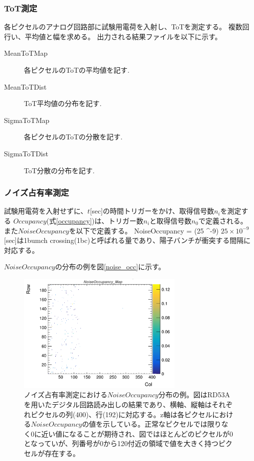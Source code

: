 \subsubsection{ToT測定}
各ピクセルのアナログ回路部に試験用電荷を入射し、ToTを測定する。
複数回行い、平均値と幅を求める。
出力される結果ファイルを以下に示す。
\begin{description}
  \item [MeanToTMap] 各ピクセルのToTの平均値を記す.
  \item [MeanToTDist] ToT平均値の分布を記す. 
  \item [SigmaToTMap] 各ピクセルのToTの分散を記す.
  \item [SigmaToTDist] ToT分散の分布を記す.
\end{description}

\subsubsection{ノイズ占有率測定}
試験用電荷を入射せずに、$t$[sec]の時間トリガーをかけ、取得信号数$n_i$を測定する
$Occupancy$(式\ref{occupancy})は、トリガー数$n_i$と取得信号数$n_0$で定義される。
また$NoiseOccupancy$を以下で定義する。
\bbb
NoiseOccupancy =  \times (25 ^{-9})
\eee
$25 \times 10^{-9}$[sec]は1bumch crossing(1bc)と呼ばれる量であり、陽子バンチが衝突する間隔に対応する。

$NoiseOccupancy$の分布の例を図\ref{noise_occ}に示す。
\begin{figure}[bpt]\centering
\includegraphics[width=8cm]{noise_occ}
\caption[ノイズ占有率測定における$NoiseOccupancy$分布の例。]{ノイズ占有率測定における$NoiseOccupancy$分布の例。図はRD53Aを用いたデジタル回路読み出しの結果であり、横軸、縦軸はそれぞれピクセルの列(400)、行(192)に対応する。z軸は各ピクセルにおける$NoiseOccupancy$の値を示している。正常なピクセルでは限りなく0に近い値になることが期待され、図ではほとんどのピクセルが0となっていが、列番号が0から120付近の領域で値を大きく持つピクセルが存在する。}
\label{threshold_scurve}
\end{figure}

